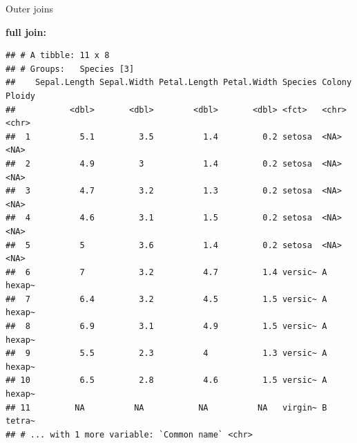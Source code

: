 \documentclass[14pt,ignorenonframetext,]{bredelebeamer}
\newenvironment{Shaded}{\begin{snugshade}}{\end{snugshade}}
\newcommand{\KeywordTok}[1]{\textcolor[rgb]{0.94,0.87,0.69}{#1}}
\newcommand{\DataTypeTok}[1]{\textcolor[rgb]{0.87,0.87,0.75}{#1}}
\newcommand{\DecValTok}[1]{\textcolor[rgb]{0.86,0.86,0.80}{#1}}
\newcommand{\StringTok}[1]{\textcolor[rgb]{0.80,0.58,0.58}{#1}}
\newcommand{\OperatorTok}[1]{\textcolor[rgb]{0.94,0.94,0.82}{#1}}
\newcommand{\NormalTok}[1]{\textcolor[rgb]{0.80,0.80,0.80}{#1}}
\begin{document}
\begin{frame}[fragile]{Outer joins}

\small
\textbf{full join:}

\begin{Shaded}
\end{Shaded}

\begin{verbatim}
## # A tibble: 11 x 8
## # Groups:   Species [3]
##    Sepal.Length Sepal.Width Petal.Length Petal.Width Species Colony Ploidy
##           <dbl>       <dbl>        <dbl>       <dbl> <fct>   <chr>  <chr> 
##  1          5.1         3.5          1.4         0.2 setosa  <NA>   <NA>  
##  2          4.9         3            1.4         0.2 setosa  <NA>   <NA>  
##  3          4.7         3.2          1.3         0.2 setosa  <NA>   <NA>  
##  4          4.6         3.1          1.5         0.2 setosa  <NA>   <NA>  
##  5          5           3.6          1.4         0.2 setosa  <NA>   <NA>  
##  6          7           3.2          4.7         1.4 versic~ A      hexap~
##  7          6.4         3.2          4.5         1.5 versic~ A      hexap~
##  8          6.9         3.1          4.9         1.5 versic~ A      hexap~
##  9          5.5         2.3          4           1.3 versic~ A      hexap~
## 10          6.5         2.8          4.6         1.5 versic~ A      hexap~
## 11         NA          NA           NA          NA   virgin~ B      tetra~
## # ... with 1 more variable: `Common name` <chr>
\end{verbatim}

\end{frame}
\end{document}
